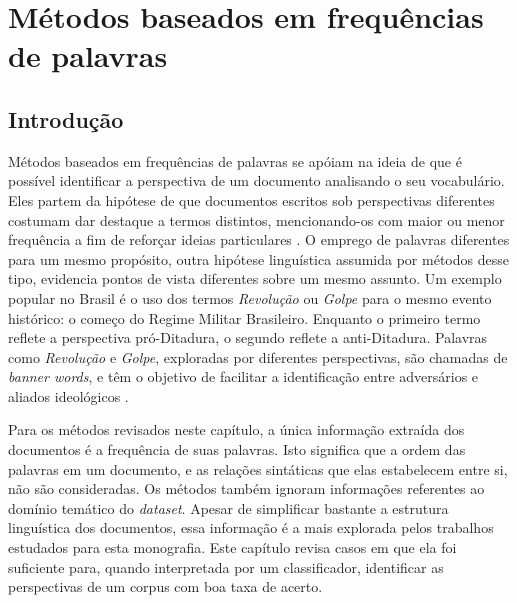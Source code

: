 \chapter{Métodos baseados em frequências de palavras}

\section{Introdução}

Métodos baseados em frequências de palavras se apóiam na ideia de que é possível identificar a perspectiva de um documento analisando o seu vocabulário. Eles partem da hipótese de que documentos escritos sob perspectivas diferentes costumam dar destaque a termos distintos, mencionando-os com maior ou menor frequência a fim de reforçar ideias particulares \cite{teubert2001}. O emprego de palavras diferentes para um mesmo propósito, outra hipótese linguística assumida por métodos desse tipo, evidencia pontos de vista diferentes sobre um mesmo assunto. Um exemplo popular no Brasil é o uso dos termos \emph{Revolução} ou \emph{Golpe} para o mesmo evento histórico: o começo do Regime Militar Brasileiro. Enquanto o primeiro termo reflete a perspectiva pró-Ditadura, o segundo reflete a anti-Ditadura. Palavras como \emph{Revolução} e \emph{Golpe}, exploradas por diferentes perspectivas, são chamadas de \emph{banner words}, e têm o objetivo de facilitar a identificação entre adversários e aliados ideológicos \cite{teubert2001}.








Para os métodos revisados neste capítulo, a única informação extraída dos documentos é a frequência de suas palavras. Isto significa que a ordem das palavras em um documento, e as relações sintáticas que elas estabelecem entre si, não são consideradas. Os métodos também ignoram informações referentes ao domínio temático do \emph{dataset}. Apesar de simplificar bastante a estrutura linguística dos documentos, essa informação é a mais explorada pelos trabalhos estudados para esta monografia. Este capítulo revisa casos em que ela foi suficiente para, quando interpretada por um classificador, identificar as perspectivas de um corpus com boa taxa de acerto. 

